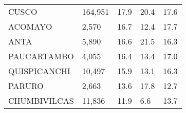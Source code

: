 \begin{tabular}{lllll}
	\cellcolor[HTML]{FF5050}CUSCO                                  & 164,951                                                               & 17.9                                                                             & 20.4                                                                        & 17.6                                                                                \\
	\cellcolor[HTML]{FF5050}ACOMAYO                                & 2,570                                                                 & 16.7                                                                             & 12.4                                                                        & 17.7                                                                                \\
	\cellcolor[HTML]{FF5050}ANTA                                   & 5,890                                                                 & 16.6                                                                             & 21.5                                                                        & 16.3                                                                                \\
	\cellcolor[HTML]{FF5050}PAUCARTAMBO                            & 4,055                                                                 & 16.4                                                                             & 13.4                                                                        & 17.0                                                                                \\
	\cellcolor[HTML]{FF5050}QUISPICANCHI                           & 10,497                                                                & 15.9                                                                             & 13.1                                                                        & 16.3                                                                                \\
	\cellcolor[HTML]{FF5050}PARURO                                 & 2,663                                                                 & 13.6                                                                             & 17.8                                                                        & 12.7                                                                                \\
	\cellcolor[HTML]{FF5050}CHUMBIVILCAS                           & 11,836                                                                & 11.9                                                                             & 6.6                                                                         & 13.7                                                                                \\

\end{tabular}
